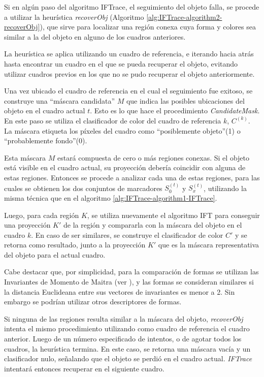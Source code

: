 Si en algún paso del algoritmo IFTrace, el seguimiento del objeto falla, se
procede a utilizar la heurística \textit{recoverObj} (Algoritmo
\ref{alg:IFTrace-algorithm2-recoverObj}), que sirve para localizar una región
conexa cuya forma y colores sea similar a la del objeto en alguno de los
cuadros anteriores.

La heurística se aplica utilizando un cuadro de referencia, e iterando hacia atrás
hasta encontrar un cuadro en el que se pueda recuperar el objeto, evitando
utilizar cuadros previos en los que no se pudo recuperar el objeto anteriormente.

Una vez ubicado el cuadro de referencia en el cual el seguimiento fue exitoso,
se construye una ``máscara candidata'' $M$ que indica las posibles ubicaciones
del objeto en el cuadro actual $t$. Esto es lo que hace el procedimiento \textit{CandidateMask}.
En este paso se
utiliza el clasificador de color del cuadro de referencia $k$, $C^{(k)}$. La máscara
etiqueta los píxeles del cuadro como ``posiblemente objeto''(1) o
``probablemente fondo''(0).

Esta máscara $M$ estará compuesta de cero
o más regiones conexas. Si el objeto está visible en el cuadro actual,
su proyección debería coincidir con alguna de estas regiones. Entonces
se procede a analizar cada una de estas regiones, para las cuales se obtienen
los dos conjuntos de marcadores $S_{0}^{(t)}$ y $S_{x}^{(t)}$, utilizando la misma técnica que en el
algoritmo \ref{alg:IFTrace-algorithm1-IFTrace}.

Luego, para cada región $K$, se utiliza nuevamente el algoritmo IFT para
conseguir una proyección $K'$ de la región y compararla con la máscara del
objeto en el cuadro $k$. En caso de ser similares, se construye el clasificador
de color $C'$ y se retorna como resultado, junto a la proyección $K'$ que es la
máscara representativa del objeto para el actual cuadro.

Cabe destacar que, por simplicidad, para la comparación de formas se utilizan
las Invariantes de Momento de Maitra (ver \cite{MaitraMomentInvariants}), y las
formas se consideran similares si la distancia Euclideana entre sus vectores de
invariantes es menor a 2. Sin embargo se podrían utilizar otros descriptores de
formas.

Si ninguna de las regiones resulta similar a la máscara del objeto,
\textit{recoverObj} intenta el mismo procedimiento utilizando como cuadro de
referencia el cuadro anterior. Luego de un número especificado de intentos, o
de agotar todos los cuadros, la heurística termina. En este caso, se retorna
una máscara vacía y un clasificador nulo, señalando que el objeto se perdió en
el cuadro actual. \textit{IFTrace} intentará entonces recuperar en el siguiente
cuadro.


